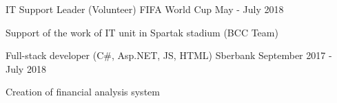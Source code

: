


\cventry
{IT Support Leader (Volunteer)} %
{FIFA World Cup} %
{} %
{May - July 2018} %
{ 
	\begin{cvitems}
		\item {Support of the work of IT unit in Spartak stadium (BCC Team)}
	\end{cvitems}
}

\cventry
{Full-stack developer (C\#, Asp.NET, JS, HTML)} %
{Sberbank} %
{} %
{September 2017 - July 2018} %
{ 
	\begin{cvitems}
		\item {Creation of financial analysis system}
	\end{cvitems}
}

